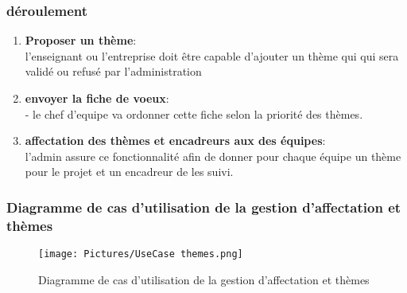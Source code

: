 \documentclass[11pt,fleqn]{book} %
\begin{document}
\subsubsection{déroulement}
\begin{enumerate}
    \item \textbf{Proposer un thème}:\\ l'enseignant ou l'entreprise doit être capable d'ajouter un thème qui qui sera validé ou refusé par l'administration
    \item \textbf{envoyer la fiche de voeux}:\\
    - le chef d'equipe va ordonner cette fiche selon la priorité des thèmes.
    \item \textbf{affectation des thèmes et encadreurs aux des équipes}:\\ l'admin assure ce fonctionnalité afin de donner pour chaque équipe un thème pour le projet et un encadreur de les suivi.
\end{enumerate}
\subsubsection{Diagramme de cas d’utilisation de la gestion d'affectation et thèmes}
\begin{figure}[h]
    \centering
    \texttt{[image: Pictures/UseCase themes.png]}
    \caption{Diagramme de cas d’utilisation de la gestion d'affectation et thèmes}
    \label{fig:pca}
\end{figure}

\end{document}
